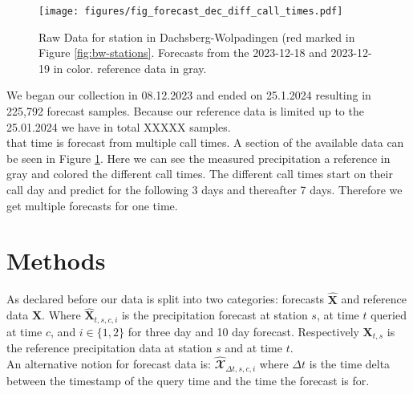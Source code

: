 \documentclass{article}
\theoremstyle{plain}
\theoremstyle{definition}
\theoremstyle{remark}
\begin{document}
\begin{figure}[h]
    \centering
    \label{fig:dec_diff_call_times}
    \texttt{[image: figures/fig\_forecast\_dec\_diff\_call\_times.pdf]}
    \caption{Raw Data for station in Dachsberg-Wolpadingen (red marked in Figure \ref{fig:bw-stations}. Forecasts from the 2023-12-18 and 2023-12-19 in color. reference data in gray.}
    
\end{figure}

We began our collection in 08.12.2023 and ended on 25.1.2024 resulting in 225,792 forecast samples. Because our reference data is limited up to the 25.01.2024 we have in total XXXXX samples. \\    
that time is forecast from multiple call times.
A section of the available data can be seen in Figure \ref{fig:dec_diff_call_times}. Here we can see the measured precipitation a reference in gray and colored the different call times. The different call times start on their call day and predict for the following 3 days and thereafter 7 days. Therefore we get multiple forecasts for one time. 

\section{Methods}\label{sec:Methods}
As declared before our data is split into two categories: forecasts $\hat{\textbf{X}}$ and reference data $\textbf{X}$. Where $\hat{\textbf{X}}_{t, s, c, i}$ is the precipitation forecast at station $s$, at time $t$ queried at time $c$, and $i \in \{1, 2\}$ for three day and 10 day forecast. Respectively  $\textbf{X}_{t, s}$ is the reference precipitation data at station $s$ and at time $t$.\\
An alternative notion for forecast data is: $\hat{\mathbfcal{X}}_{\Delta t, s, c, i}$ where $\Delta t$ is the time delta between the timestamp of the query time and the time the forecast is for.
\end{document}
